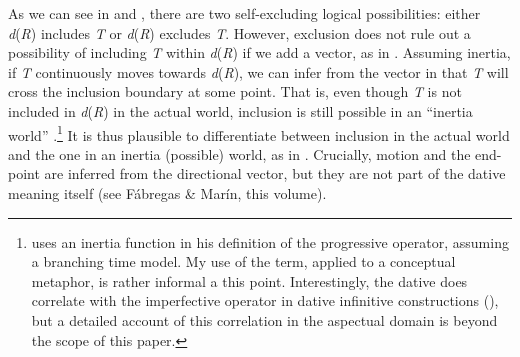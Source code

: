 \documentclass[output=paper,modfonts,nonflat]{langsci/langscibook}
\begin{document}





As we can see in  and , there are two self-excluding logical possibilities: either \textit{d}(\textit{R}) includes \textit{T} or \textit{d}(\textit{R}) excludes \textit{T}. However, exclusion does not rule out a possibility of including \textit{T} within \textit{d}(\textit{R}) if we add a vector, as in . Assuming inertia, if \textit{T} continuously moves towards \textit{d}(\textit{R}), we can infer from the vector in  that \textit{T} will cross the inclusion boundary at some point. That is, even though \textit{T} is not included in \textit{d}(\textit{R}) in the actual world, inclusion is still possible in an “inertia world” \citep[148]{Dowty1979}.\footnote{\citet{Dowty1979} uses an inertia function in his definition of the progressive operator, assuming a branching time model. My use of the term, applied to a conceptual metaphor, is rather informal a this point. Interestingly, the dative does correlate with the imperfective operator in dative infinitive constructions (), but a detailed account of this correlation in the aspectual domain is beyond the scope of this paper. }  It is thus plausible to differentiate between inclusion in the actual world and the one in an inertia (possible) world, as in . Crucially, motion and the end-point are inferred from the directional vector, but they are not part of the dative meaning itself (see Fábregas \& Marín, this volume).  
\end{document}
